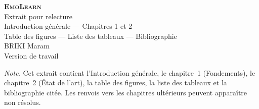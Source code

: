 \documentclass[12pt,a4paper,oneside]{report}
\newcommand{\emolearn}{\textsc{EmoLearn}}
\begin{document}
\dominitoc

\begin{center}
  {\Large\textbf{\emolearn{}}}\\[0.6em]
  {\large Extrait pour relecture}\\[0.3em]
  {\normalsize Introduction générale --- Chapitres 1 et 2}\\[0.2em]
  {\normalsize Table des figures --- Liste des tableaux --- Bibliographie}\\[0.5em]
  {\normalsize BRIKI Maram}\\[0.2em]
  {\small Version de travail}
\end{center}
\vspace{0.8em}
\noindent\textit{Note.} Cet extrait contient l'Introduction générale, le
chapitre~1 (Fondements), le chapitre~2 (État de l'art), la table des figures,
la liste des tableaux et la bibliographie citée. Les renvois vers les
chapitres ultérieurs peuvent apparaître non résolus.

\renewcommand{\contentsname}{\textbf{Table des matières}}
\tableofcontents

\clearpage
{}
{}
\mtcaddchapter
\renewcommand{\listfigurename}{\textbf{Table des figures}}
\listoffigures

\clearpage
{}
{}
\mtcaddchapter
\renewcommand{\listtablename}{\textbf{Liste des tableaux}}
\listoftables

\clearpage
{}






\cleardoublepage
\printbibliography[heading=bibintoc,title={\textbf{Bibliographie}}]
\end{document}
